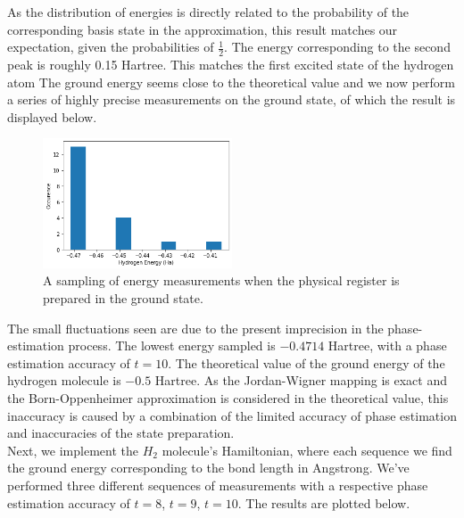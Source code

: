 As the distribution of energies is directly related to the probability of the corresponding basis state in the approximation, this result matches our expectation, given the probabilities of $\frac{1}{2}$. The energy corresponding to the second peak is roughly 0.15 Hartree. This matches the first excited state of the hydrogen atom The ground energy seems close to the theoretical value and we now perform a series of highly precise measurements on the ground state, of which the result is displayed below.

\begin{figure}[h]
  \center \includegraphics[width = 0.5\textwidth]{ground.png}
  \caption{A sampling of energy measurements when the physical register is prepared in the ground state.}
\end{figure}

The small fluctuations seen are due to the present imprecision in the phase-estimation process. The lowest energy sampled is $-0.4714$ Hartree, with a phase estimation accuracy of $t = 10$. The theoretical value of the ground energy of the hydrogen molecule is $-0.5$ Hartree. As the Jordan-Wigner mapping is exact and the Born-Oppenheimer approximation is considered in the theoretical value, this inaccuracy is caused by a combination of the limited accuracy of phase estimation and inaccuracies of the state preparation.\\

Next, we implement the $H_2$ molecule's Hamiltonian, where each sequence we find the ground energy corresponding to the bond length in Angstrong. We've performed three different sequences of measurements with a respective phase estimation accuracy of $t=8$, $t = 9$, $t=10$. The results are plotted below.

